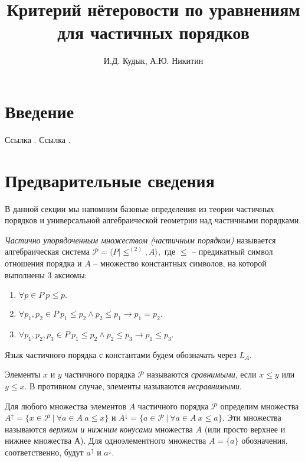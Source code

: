 \documentclass[12pt]{article}
\title{Критерий нётеровости по уравнениям для частичных порядков}
\author{И.Д. Кудык, А.Ю. Никитин}
\theoremstyle{break}
\def\P{\mathcal{P}}
\begin{document}
    \maketitle %
    \thispagestyle{empty} %
    \tableofcontents %
    \newpage
    
    \section{Введение}
    Ссылка \cite{Gretzer}. Ссылка \cite{AlgGeom}.

	\section{Предварительные сведения}
		В данной секции мы напомним базовые определения из теории частичных порядков и универсальной алгебраической геометрии над частичными порядками.
			
		\textit{Частично упорядоченным множеством (частичным порядком)} называется алгебраическая система $\P = \langle P | \leqslant^{(2)}, A\rangle,$ где $\leqslant$ -- предикатный символ отношения порядка и $A$ -- множество константных символов, на которой выполнены 3 аксиомы:
		\begin{enumerate}
			\item $\forall p\in P\ p\leqslant p.$
			\item $\forall p_1, p_2\in P\ p_1 \leqslant p_2 \wedge p_2 \leqslant p_1 \rightarrow p_1=p_2.$
			\item $\forall p_1, p_2, p_3\in P\ p_1 \leqslant p_2 \wedge p_2 \leqslant p_3 \rightarrow p_1 \leqslant p_3.$
		\end{enumerate}

		Язык частичного порядка с константами будем обозначать через $L_A.$
		
		Элементы $x$ и $y$ частичного порядка $\P$ называются \textit{сравнимыми}, если $x\leqslant y$ или $y\leqslant x.$ В противном случае, элементы называются \textit{несравнимыми}.
	
		Для любого множества элементов $A$ частичного порядка $\P$ определим множества $A^{\uparrow} = \{ x\in\P\ |\ \forall a\in A\ a\leqslant x\}$ и $A^{\downarrow} = \{ a\in\P\ |\ \forall a\in A\ x\leqslant a\}$. Эти множества называются \textit{верхним и нижним конусами} множества $A$ (или просто верхнее и нижнее множества А). Для одноэлементного множества $A=\{a\}$ обозначения, соответственно, будут $a^{\uparrow}$ и $a^{\downarrow}.$
\end{document}
